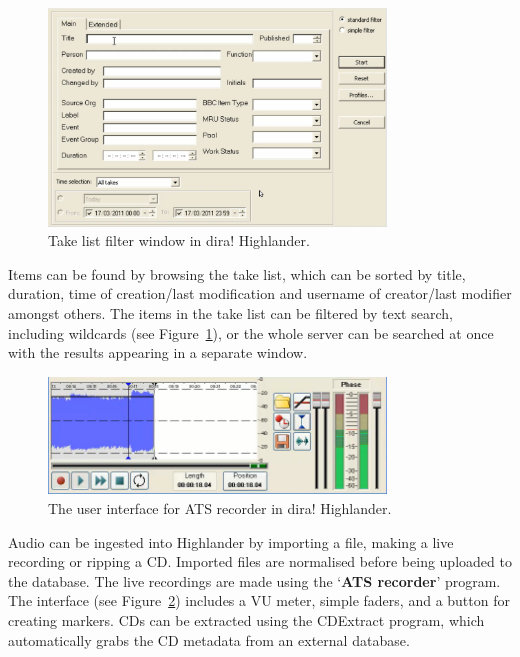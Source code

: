 \begin{figure}[p]
\centering
\includegraphics[width=0.8\textwidth]{figs/highlander-filter.png}
\caption{Take list filter window in dira! Highlander.}
\label{fig:highlanderfilter}
\end{figure}

Items can be found by browsing the take list, which can be sorted by title,
duration, time of creation/last modification and username of creator/last
modifier amongst others. The items in the take list can be filtered by text
search, including wildcards (see Figure~\ref{fig:highlanderfilter}), or the
whole server can be searched at once with the results appearing in a separate
window.

\begin{figure}[p]
\centering
\includegraphics[width=0.8\textwidth]{figs/ats-recorder.png}
\caption{The user interface for ATS recorder in dira! Highlander.}
\label{fig:atsrecorder}
\end{figure}

Audio can be ingested into Highlander by importing a file, making a live
recording or ripping a CD. Imported files are normalised before being uploaded
to the database. The live recordings are made using the `\textbf{ATS recorder}'
program. The interface (see Figure~\ref{fig:atsrecorder}) includes a VU meter,
simple faders, and a button for creating markers. CDs can be extracted using
the CDExtract program, which automatically grabs the CD metadata from an
external database.

